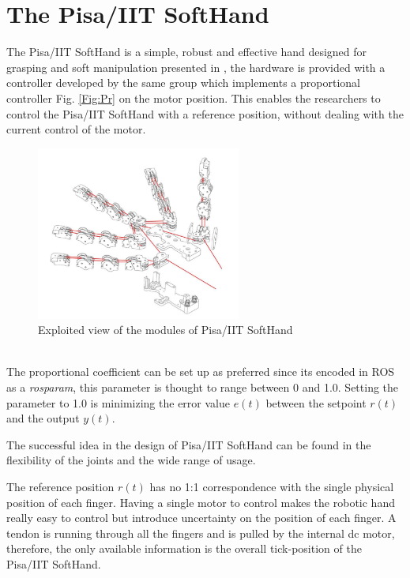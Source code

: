 \section{The Pisa/IIT SoftHand}
The Pisa/IIT SoftHand is a simple, robust and effective hand designed for grasping and soft manipulation presented in \cite{catalanopisa}, the hardware is provided with a controller developed by the same group which implements a proportional controller Fig. \ref{Fig:Pr} on the motor position. This enables the researchers to control the Pisa/IIT SoftHand with a reference position, without dealing with the current control of the motor.\\
\begin{figure}[h]
\centering
\includegraphics[width=0.6\textwidth]{Figure/softhand.png}
\caption{Exploited view of the modules of Pisa/IIT SoftHand}
\label{Fig:Softhand}
\end{figure}\\
The proportional coefficient can be set up as preferred since its encoded in ROS as a \textit{rosparam}, this parameter is thought to range between 0 and 1.0. Setting the parameter to 1.0 is minimizing the error value $e(t)$  between the setpoint $r(t)$ and the output $y(t)$.

The successful idea in the design of Pisa/IIT SoftHand can be found in the flexibility of the joints and the wide range of usage.

The reference position $r(t)$ has no 1:1 correspondence with the single physical position of each finger. Having a single motor to control makes the robotic hand really easy to control but introduce uncertainty on the position of each finger. A tendon is running through all the fingers and is pulled by the internal dc motor, therefore, the only available information is the overall tick-position of the Pisa/IIT SoftHand. 

